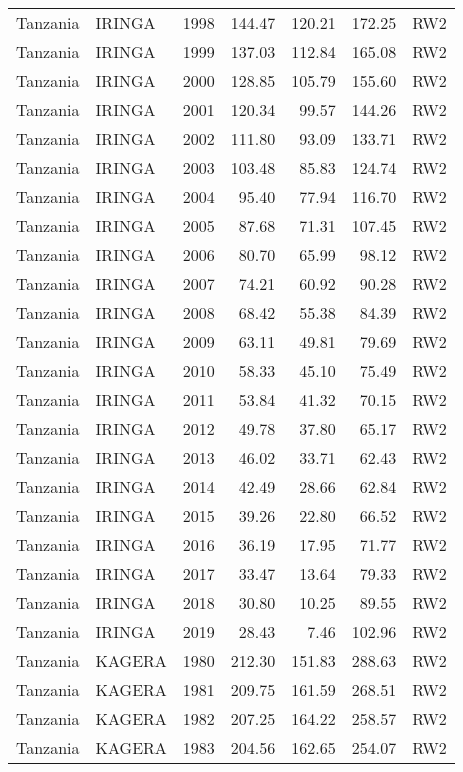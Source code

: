\begin{longtable}{lllrrrl}
  Tanzania & IRINGA & 1998 & 144.47 & 120.21 & 172.25 & RW2 \\ 
  Tanzania & IRINGA & 1999 & 137.03 & 112.84 & 165.08 & RW2 \\ 
  Tanzania & IRINGA & 2000 & 128.85 & 105.79 & 155.60 & RW2 \\ 
  Tanzania & IRINGA & 2001 & 120.34 & 99.57 & 144.26 & RW2 \\ 
  Tanzania & IRINGA & 2002 & 111.80 & 93.09 & 133.71 & RW2 \\ 
  Tanzania & IRINGA & 2003 & 103.48 & 85.83 & 124.74 & RW2 \\ 
  Tanzania & IRINGA & 2004 & 95.40 & 77.94 & 116.70 & RW2 \\ 
  Tanzania & IRINGA & 2005 & 87.68 & 71.31 & 107.45 & RW2 \\ 
  Tanzania & IRINGA & 2006 & 80.70 & 65.99 & 98.12 & RW2 \\ 
  Tanzania & IRINGA & 2007 & 74.21 & 60.92 & 90.28 & RW2 \\ 
  Tanzania & IRINGA & 2008 & 68.42 & 55.38 & 84.39 & RW2 \\ 
  Tanzania & IRINGA & 2009 & 63.11 & 49.81 & 79.69 & RW2 \\ 
  Tanzania & IRINGA & 2010 & 58.33 & 45.10 & 75.49 & RW2 \\ 
  Tanzania & IRINGA & 2011 & 53.84 & 41.32 & 70.15 & RW2 \\ 
  Tanzania & IRINGA & 2012 & 49.78 & 37.80 & 65.17 & RW2 \\ 
  Tanzania & IRINGA & 2013 & 46.02 & 33.71 & 62.43 & RW2 \\ 
  Tanzania & IRINGA & 2014 & 42.49 & 28.66 & 62.84 & RW2 \\ 
  Tanzania & IRINGA & 2015 & 39.26 & 22.80 & 66.52 & RW2 \\ 
  Tanzania & IRINGA & 2016 & 36.19 & 17.95 & 71.77 & RW2 \\ 
  Tanzania & IRINGA & 2017 & 33.47 & 13.64 & 79.33 & RW2 \\ 
  Tanzania & IRINGA & 2018 & 30.80 & 10.25 & 89.55 & RW2 \\ 
  Tanzania & IRINGA & 2019 & 28.43 & 7.46 & 102.96 & RW2 \\ 
  Tanzania & KAGERA & 1980 & 212.30 & 151.83 & 288.63 & RW2 \\ 
  Tanzania & KAGERA & 1981 & 209.75 & 161.59 & 268.51 & RW2 \\ 
  Tanzania & KAGERA & 1982 & 207.25 & 164.22 & 258.57 & RW2 \\ 
  Tanzania & KAGERA & 1983 & 204.56 & 162.65 & 254.07 & RW2 \\ 

\end{longtable}
